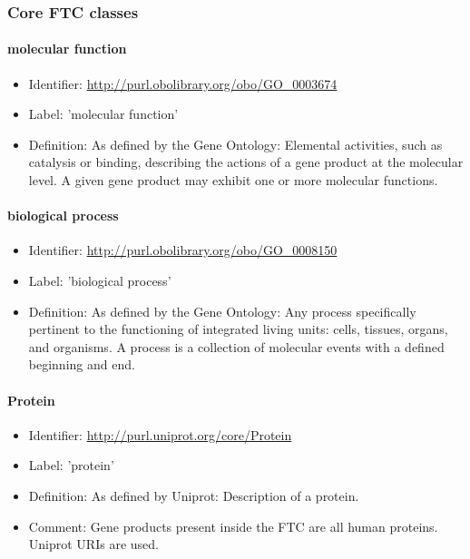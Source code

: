 \subsubsection{Core FTC classes}

\paragraph{molecular function}
\begin{itemize}
  \item Identifier: \url{http://purl.obolibrary.org/obo/GO\_0003674}
  \item Label: 'molecular function'
  \item Definition: As defined by the Gene Ontology: Elemental activities, such as catalysis or binding, describing the actions of a gene product at the molecular level. A given gene product may exhibit one or more molecular functions.
\end{itemize}

\paragraph{biological process}
\begin{itemize}
  \item Identifier: \url{http://purl.obolibrary.org/obo/GO\_0008150}
  \item Label: 'biological process'
  \item Definition: As defined by the Gene Ontology: Any process specifically pertinent to the functioning of integrated living units: cells, tissues, organs, and organisms. A process is a collection of molecular events with a defined beginning and end.
\end{itemize}

\paragraph{Protein}
\begin{itemize}
  \item Identifier: \url{http://purl.uniprot.org/core/Protein}
  \item Label: 'protein'
  \item Definition: As defined by Uniprot: Description of a protein.
  \item Comment: Gene products present inside the FTC are all human proteins. Uniprot URIs are used.
\end{itemize}

